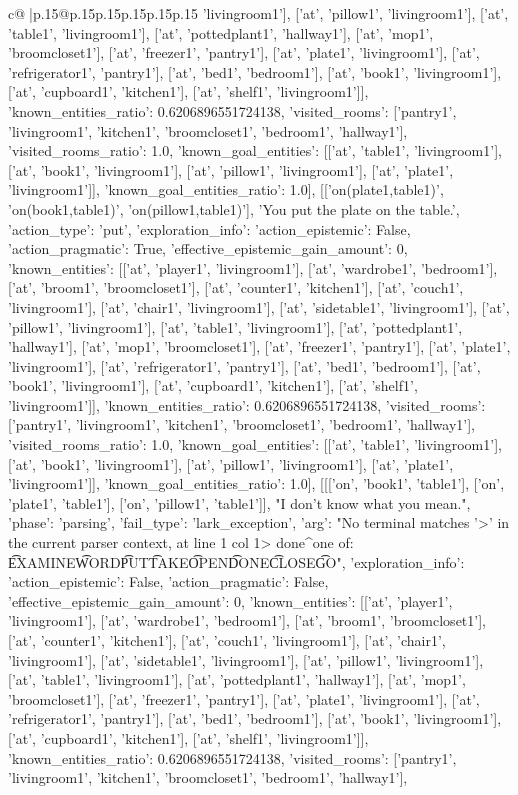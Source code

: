 \documentclass{article}
\begin{document}
{\begin{supertabular}{c@{$\;$}|p{.15\linewidth}@{}p{.15\linewidth}p{.15\linewidth}p{.15\linewidth}p{.15\linewidth}p{.15\linewidth}}
{{{'livingroom1'], ['at', 'pillow1', 'livingroom1'], ['at', 'table1', 'livingroom1'], ['at', 'pottedplant1', 'hallway1'], ['at', 'mop1', 'broomcloset1'], ['at', 'freezer1', 'pantry1'], ['at', 'plate1', 'livingroom1'], ['at', 'refrigerator1', 'pantry1'], ['at', 'bed1', 'bedroom1'], ['at', 'book1', 'livingroom1'], ['at', 'cupboard1', 'kitchen1'], ['at', 'shelf1', 'livingroom1']], 'known_entities_ratio': 0.6206896551724138, 'visited_rooms': ['pantry1', 'livingroom1', 'kitchen1', 'broomcloset1', 'bedroom1', 'hallway1'], 'visited_rooms_ratio': 1.0, 'known_goal_entities': [['at', 'table1', 'livingroom1'], ['at', 'book1', 'livingroom1'], ['at', 'pillow1', 'livingroom1'], ['at', 'plate1', 'livingroom1']], 'known_goal_entities_ratio': 1.0}}], [['on(plate1,table1)', 'on(book1,table1)', 'on(pillow1,table1)'], 'You put the plate on the table.', {'action_type': 'put', 'exploration_info': {'action_epistemic': False, 'action_pragmatic': True, 'effective_epistemic_gain_amount': 0, 'known_entities': [['at', 'player1', 'livingroom1'], ['at', 'wardrobe1', 'bedroom1'], ['at', 'broom1', 'broomcloset1'], ['at', 'counter1', 'kitchen1'], ['at', 'couch1', 'livingroom1'], ['at', 'chair1', 'livingroom1'], ['at', 'sidetable1', 'livingroom1'], ['at', 'pillow1', 'livingroom1'], ['at', 'table1', 'livingroom1'], ['at', 'pottedplant1', 'hallway1'], ['at', 'mop1', 'broomcloset1'], ['at', 'freezer1', 'pantry1'], ['at', 'plate1', 'livingroom1'], ['at', 'refrigerator1', 'pantry1'], ['at', 'bed1', 'bedroom1'], ['at', 'book1', 'livingroom1'], ['at', 'cupboard1', 'kitchen1'], ['at', 'shelf1', 'livingroom1']], 'known_entities_ratio': 0.6206896551724138, 'visited_rooms': ['pantry1', 'livingroom1', 'kitchen1', 'broomcloset1', 'bedroom1', 'hallway1'], 'visited_rooms_ratio': 1.0, 'known_goal_entities': [['at', 'table1', 'livingroom1'], ['at', 'book1', 'livingroom1'], ['at', 'pillow1', 'livingroom1'], ['at', 'plate1', 'livingroom1']], 'known_goal_entities_ratio': 1.0}}], [[['on', 'book1', 'table1'], ['on', 'plate1', 'table1'], ['on', 'pillow1', 'table1']], "I don't know what you mean.", {'phase': 'parsing', 'fail_type': 'lark_exception', 'arg': "No terminal matches '>' in the current parser context, at line 1 col 1\n\n> done\n^\nExpected one of: \n\t* EXAMINE\n\t* WORD\n\t* PUT\n\t* TAKE\n\t* OPEN\n\t* DONE\n\t* CLOSE\n\t* GO\n", 'exploration_info': {'action_epistemic': False, 'action_pragmatic': False, 'effective_epistemic_gain_amount': 0, 'known_entities': [['at', 'player1', 'livingroom1'], ['at', 'wardrobe1', 'bedroom1'], ['at', 'broom1', 'broomcloset1'], ['at', 'counter1', 'kitchen1'], ['at', 'couch1', 'livingroom1'], ['at', 'chair1', 'livingroom1'], ['at', 'sidetable1', 'livingroom1'], ['at', 'pillow1', 'livingroom1'], ['at', 'table1', 'livingroom1'], ['at', 'pottedplant1', 'hallway1'], ['at', 'mop1', 'broomcloset1'], ['at', 'freezer1', 'pantry1'], ['at', 'plate1', 'livingroom1'], ['at', 'refrigerator1', 'pantry1'], ['at', 'bed1', 'bedroom1'], ['at', 'book1', 'livingroom1'], ['at', 'cupboard1', 'kitchen1'], ['at', 'shelf1', 'livingroom1']], 'known_entities_ratio': 0.6206896551724138, 'visited_rooms': ['pantry1', 'livingroom1', 'kitchen1', 'broomcloset1', 'bedroom1', 'hallway1'], }}}
\end{supertabular}}
\end{document}
